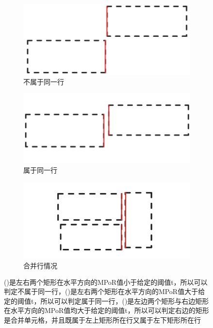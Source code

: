 \documentclass[UTF8,12pt, AutoFakeBold,fontset = founder]{ctexart}
\begin{document}
\begin{figure}[H]
    \centering
    \begin{subfigure}[b]{0.3\textwidth}
        \includegraphics[width=\textwidth]{../images/a.png}
        \caption{不属于同一行}
        \label{fig:a}
    \end{subfigure}
    \hfill
    \begin{subfigure}[b]{0.3\textwidth}
        \includegraphics[width=\textwidth]{../images/b.png}
        \caption{属于同一行}
        \label{fig:b}
    \end{subfigure}
    \hfill
    \begin{subfigure}[b]{0.3\textwidth}
        \includegraphics[width=\textwidth]{../images/c.png}
        \caption{合并行情况}
        \label{fig:c}
    \end{subfigure}
    \captionsetup{labelsep=colon} 
    \caption{()是左右两个矩形在水平方向的MPoR值小于给定的阈值t，所以可以判定不属于同一行，()是左右两个矩形在水平方向的MPoR值大于给定的阈值t，所以可以判定属于同一行，()是左边两个矩形与右边矩形在水平方向的MPoR值均大于给定的阈值t，所以可以判定右边的矩形是合并单元格，并且既属于左上矩形所在行又属于左下矩形所在行}
\end{figure}
\end{document}
